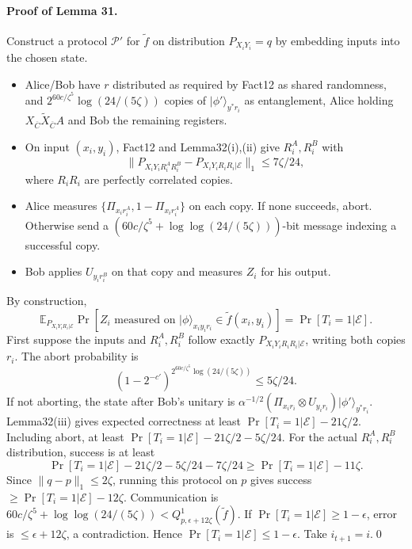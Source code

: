 \documentclass[10pt,a4paper]{article}
\providecommand{\ket}[1]{\lvert#1\rangle}
\begin{document}
\paragraph{Proof of Lemma 31.} Construct a protocol $\mathcal P'$ for $\widetilde f$ on distribution $P_{X_iY_i}=q$ by embedding inputs into the chosen state.
\begin{itemize}\item Alice/Bob have $r$ distributed as required by Fact12 as shared randomness, and $2^{60c/\zeta^5}\log(24/(5\zeta))$ copies of $\ket{\phi'}_{y^*r_i}$ as entanglement, Alice holding $X_{\overline C}\widetilde X_{\overline C}A$ and Bob the remaining registers.
\item On input $(x_i,y_i)$, Fact12 and Lemma32(i),(ii) give $R_i^A,R_i^B$ with
\[\|P_{X_iY_iR_i^AR_i^B}-P_{X_iY_iR_iR_i|\mathcal E}\|_1\le7\zeta/24,\]
where $R_iR_i$ are perfectly correlated copies.
\item Alice measures $\{\Pi_{x_ir_i^A},1-\Pi_{x_ir_i^A}\}$ on each copy. If none succeeds, abort. Otherwise send a $(60c/\zeta^5+\log\log(24/(5\zeta)))$-bit message indexing a successful copy.
\item Bob applies $U_{y_ir_i^B}$ on that copy and measures $Z_i$ for his output.\end{itemize}
By construction,
\[\mathbb E_{P_{X_iY_iR_i|\mathcal E}}\Pr[Z_i\text{ measured on }\ket\phi_{x_iy_ir_i}\in\widetilde f(x_i,y_i)]=\Pr[T_i=1|\mathcal E].\]
First suppose the inputs and $R_i^A,R_i^B$ follow exactly $P_{X_iY_iR_iR_i|\mathcal E}$, writing both copies $r_i$. The abort probability is
\[(1-2^{-c'})^{2^{60c/\zeta^5}\log(24/(5\zeta))}\le5\zeta/24.\]
If not aborting, the state after Bob's unitary is $\alpha^{-1/2}(\Pi_{x_ir_i}\otimes U_{y_ir_i})\ket{\phi'}_{y^*r_i}$. Lemma32(iii) gives expected correctness at least $\Pr[T_i=1|\mathcal E]-21\zeta/2$. Including abort, at least $\Pr[T_i=1|\mathcal E]-21\zeta/2-5\zeta/24$. For the actual $R_i^A,R_i^B$ distribution, success is at least
\[\Pr[T_i=1|\mathcal E]-21\zeta/2-5\zeta/24-7\zeta/24\ge\Pr[T_i=1|\mathcal E]-11\zeta.\]
Since $\|q-p\|_1\le2\zeta$, running this protocol on $p$ gives success $\ge\Pr[T_i=1|\mathcal E]-12\zeta$. Communication is $60c/\zeta^5+\log\log(24/(5\zeta))<Q^1_{p,\epsilon+12\zeta}(\widetilde f)$. If $\Pr[T_i=1|\mathcal E]\ge1-\epsilon$, error is $\le\epsilon+12\zeta$, a contradiction. Hence $\Pr[T_i=1|\mathcal E]\le1-\epsilon$. Take $i_{t+1}=i$.\qed
\end{document}
